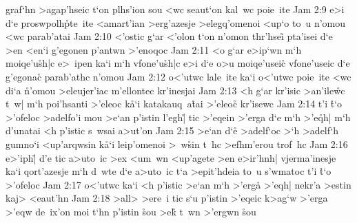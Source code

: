graf`hn
>agap'hseic
t`on
plhs'ion
sou
<wc
seaut`on
kal~wc
poie~ite\bibvsend
\vs Jam 2:9
e>i
d`e
proswpolh\r{p}te~ite
<amart'ian
>erg'azesje
>elegq'omenoi
<up`o
to~u
n'omou
<wc
parab'atai\bibvsend
\vs Jam 2:10
<'ostic
g`ar
<'olon
t`on
n'omon
thr'hsei\r{}
pta'isei
d`e
>en
<en`i
g'egonen
p'antwn
>'enoqoc\bibvsend
\vs Jam 2:11
<o
g`ar
e>ip`wn
m`h
moiqe'u\r{s}h|c
e>~ipen
ka`i
m`h
vfone'u\r{s}h|c
e>i
d`e
o>u
moiqe'useic\r{}
vfone'useic
d`e
g'egonac\r{}
parab'athc
n'omou\bibvsend
\vs Jam 2:12
o<'utwc
lale~ite
ka`i
o<'utwc
poie~ite
<wc
di`a
\r{n}'omou
>eleujer'iac
m'ellontec
kr'inesjai\bibvsend
\vs Jam 2:13
<h
g`ar
kr'isic
>an'ile\r{w}c
t~w|
m`h
poi'hsanti
>'eleoc
k\r{a}`i
katakauq~a\r{t}ai
>'eleo\r{c}
kr'isewc\bibvsend
\vs Jam 2:14
t'i
\r{t}`o
>'ofeloc
>adelfo'i
mou
>e`an
p'istin
l'egh|\r{}
tic
>'eqein
>'erga
d`e
m`h
>'e\r{q}h|
m`h
d'unatai
<h
p'istic
s~wsai
a>ut'on\bibvsend
\vs Jam 2:15
>e`an
d`e\r{}
>adelf`oc
>`h
>adelf`h
gumno`i
<up'arqwsin
k\r{a}`i
leip'omenoi
>~w\r{s}in
t~hc
>efhm'erou
trof~hc\bibvsend
\vs Jam 2:16
e>'iph|\r{}
d'e
tic
a>uto~ic
>ex
<um~wn
<up'agete
>en
e>ir'hnh|
vjerma'inesje
ka`i
qort'azesje
m`h
d~wte
d`e
a>uto~ic
t`a
>epit'hdeia
to~u
s'wmatoc
t'i
\r{t}`o
>'ofeloc\bibvsend
\vs Jam 2:17
o<'utwc
ka`i
<h
p'istic
>e`an
m`h
>'erga\r{}
>'eqh|
nekr'a
>estin
kaj>
<eaut'hn\bibvsend
\vs Jam 2:18
>all>
>ere~i
tic
s`u
p'istin
>'eqeic
k>ag`w
>'erga
>'eqw
de~ix'on
moi
t`hn
p'istin
\r{s}ou
>e\r{k}
t~wn
>'ergwn
\r{s}ou
